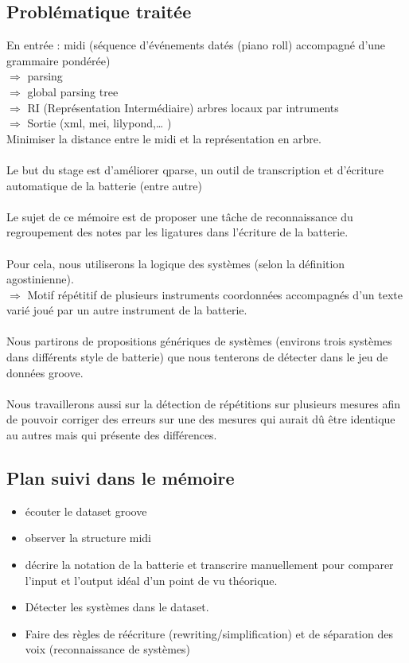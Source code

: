 \subsection*{Problématique traitée}	
	En entrée : midi (séquence d’événements datés (piano roll) accompagné d’une grammaire pondérée)\\
	$\Rightarrow$ parsing\\
	$\Rightarrow$ global parsing tree\\
	$\Rightarrow$ RI (Représentation Intermédiaire) arbres locaux par intruments\\
	$\Rightarrow$ Sortie (xml, mei, lilypond,… )\\
	Minimiser la distance entre le midi et la représentation en arbre.\\\\
	Le but du stage est d’améliorer qparse, un outil de transcription et d’écriture automatique de la batterie (entre autre)\\\\
	Le sujet de ce mémoire est de proposer une tâche de reconnaissance du regroupement des notes par les ligatures dans l’écriture de la batterie.\\\\
	Pour cela, nous utiliserons la logique des systèmes (selon la définition agostinienne).\\$\Rightarrow$ Motif répétitif de plusieurs instruments coordonnées accompagnés d’un texte varié joué par un autre instrument de la batterie.\\\\Nous partirons de propositions génériques de systèmes (environs trois systèmes dans différents style de batterie) que nous tenterons de détecter dans le jeu de données groove.\\\\
	Nous travaillerons aussi sur la détection de répétitions sur plusieurs mesures afin de pouvoir corriger des erreurs sur une des mesures qui aurait dû être identique au autres mais qui présente des différences.
	
\subsection*{Plan suivi dans le mémoire}
\begin{itemize}
	\item écouter le dataset groove
	\item observer la structure midi
	\item décrire la notation de la batterie et transcrire manuellement pour comparer l’input et l’output idéal d’un point de vu théorique.
	\item Détecter les systèmes dans le dataset.
	\item Faire des règles de réécriture (rewriting/simplification) et de séparation des voix (reconnaissance de systèmes)
\end{itemize}
	